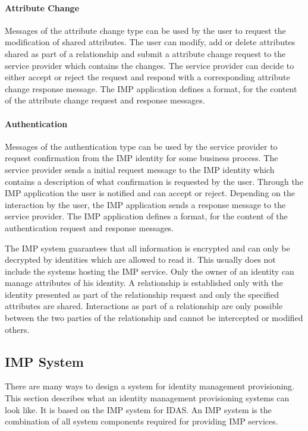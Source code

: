 \paragraph{Attribute Change} Messages of the attribute change type can be used by the user to request the modification of shared attributes. The user can modify, add or delete attributes shared as part of a relationship and submit a attribute change request to the service provider which contains the changes. The service provider can decide to either accept or reject the request and respond with a corresponding attribute change response message. The IMP application defines a format, for the content of the attribute change request and response messages.

\paragraph{Authentication} Messages of the authentication type can be used by the service provider to request confirmation from the IMP identity for some business process. The service provider sends a initial request message to the IMP identity which contains a description of what confirmation is requested by the user. Through the IMP application the user is notified and can accept or reject. Depending on the interaction by the user, the IMP application sends a response message to the service provider. The IMP application defines a format, for the content of the authentication request and response messages.

The IMP system guarantees that all information is encrypted and can only be decrypted by identities which are allowed to read it. This usually does not include the systems hosting the IMP service. Only the owner of an identity can manage attributes of his identity. A relationship is established only with the identity presented as part of the relationship request and only the specified attributes are shared. Interactions as part of a relationship are only possible between the two parties of the relationship and cannot be intercepted or modified others.

\subsection{IMP System} \label{section:imp_system}

There are many ways to design a system for identity management provisioning. This section describes what an identity management provisioning systems can look like. It is based on the IMP system for IDAS. An IMP system is the combination of all system components required for providing IMP services. 

